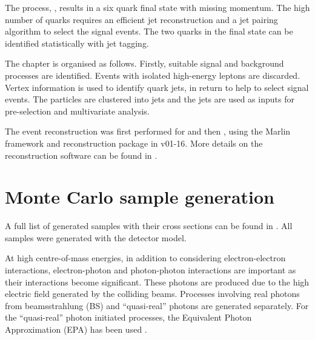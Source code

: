 
The process, \eeToHHbbWWHadFull, results in a six quark final state with missing momentum. The high number of quarks requires an efficient jet reconstruction and a jet pairing algorithm to select the signal events. The two \Pbottom quarks in the final state can be identified statistically with \Pbottom jet tagging. %

The chapter is organised as follows. Firstly, suitable signal and background processes are identified. Events with isolated high-energy leptons are discarded.  Vertex information is used to identify \Pbottom quark jets, in return to help to select signal events. The particles are clustered into jets and the jets are used as inputs for pre-selection and multivariate analysis.

The event reconstruction was first performed for  and then , using the Marlin framework and reconstruction package in \ilcsoft v01-16. More details on the reconstruction software can be found in .



\section{Monte Carlo sample generation}

A full list of generated samples with their cross sections can be found in . All samples were generated with the \CLICILD detector model.

At high centre-of-mass energies, in addition to considering electron-electron interactions, electron-photon and photon-photon interactions are important as their interactions become significant. These photons are produced due to the high electric field generated by the colliding beams. Processes involving real photons from beamsstrahlung (BS) and ``quasi-real'' photons are generated separately. For the ``quasi-real'' photon initiated processes, the Equivalent Photon Approximation (EPA) has been used \cite{lyth:jpa00215525}.

